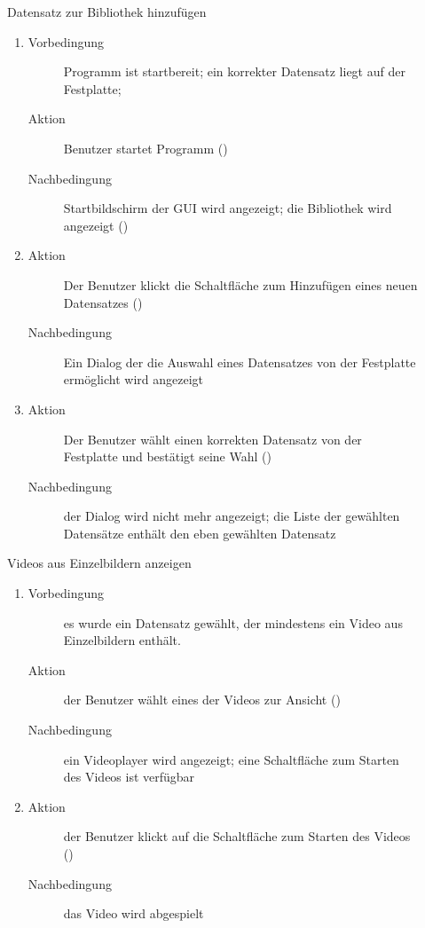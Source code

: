 \begin{description}
	\item[] Datensatz zur Bibliothek hinzufügen
	\begin{enumerate}
		\item
		\begin{description}
			\item[Vorbedingung] Programm ist startbereit; ein korrekter Datensatz liegt auf der Festplatte; %
			\item[Aktion] Benutzer startet Programm ()
			\item[Nachbedingung] Startbildschirm der GUI wird angezeigt; die Bibliothek wird angezeigt ()
		\end{description}
		\item
		\begin{description}
			\item[Aktion] Der Benutzer klickt die Schaltfläche zum Hinzufügen eines neuen Datensatzes ()
			\item[Nachbedingung] Ein Dialog der die Auswahl eines Datensatzes von der Festplatte ermöglicht wird angezeigt
		\end{description}
		\item
		\begin{description}
			\item[Aktion] Der Benutzer wählt einen korrekten Datensatz von der Festplatte und bestätigt seine Wahl ()
			\item[Nachbedingung] der Dialog wird nicht mehr angezeigt; die Liste der gewählten Datensätze enthält den eben gewählten Datensatz
		\end{description}
	\end{enumerate}

	\item[] Videos aus Einzelbildern anzeigen
	\begin{enumerate}
		\item
		\begin{description}
			\item[Vorbedingung] es wurde ein Datensatz gewählt, der mindestens ein Video aus Einzelbildern enthält.
			\item[Aktion] der Benutzer wählt eines der Videos zur Ansicht ()
			\item[Nachbedingung] ein Videoplayer wird angezeigt; eine Schaltfläche zum Starten des Videos ist verfügbar
		\end{description}
		\item
		\begin{description}
			\item[Aktion] der Benutzer klickt auf die Schaltfläche zum Starten des Videos ()
			\item[Nachbedingung] das Video wird abgespielt
		\end{description}
	\end{enumerate}


\end{description}
